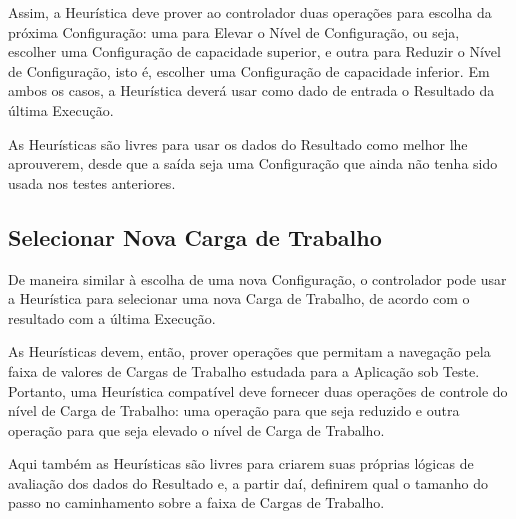 Assim, a Heurística deve prover ao controlador duas operações para escolha da 
próxima Configuração: uma para Elevar o Nível de Configuração, ou seja, escolher
uma Configuração de capacidade superior, e outra para Reduzir o Nível de 
Configuração, isto é, escolher uma Configuração de capacidade inferior. Em ambos
os casos, a Heurística deverá usar como dado de entrada o Resultado da última 
Execução.

As Heurísticas são livres para usar os dados do Resultado como melhor lhe 
aprouverem, desde que a saída seja uma Configuração que ainda não tenha sido 
usada nos testes anteriores. 

\subsection{Selecionar Nova Carga de Trabalho}
De maneira similar à escolha de uma nova Configuração, o controlador pode usar
a Heurística para selecionar uma nova Carga de Trabalho, de acordo com o 
resultado com a última Execução.

As Heurísticas devem, então, prover operações que permitam a navegação pela
faixa de valores de Cargas de Trabalho estudada para a Aplicação sob Teste. 
Portanto, uma Heurística compatível deve fornecer duas operações de controle do
nível de Carga de Trabalho: uma operação para que seja reduzido e outra operação 
para que seja elevado o nível de Carga de Trabalho.

Aqui também as Heurísticas são livres para criarem suas próprias lógicas de 
avaliação dos dados do Resultado e, a partir daí, definirem qual o tamanho do
passo no caminhamento sobre a faixa de Cargas de Trabalho.
 
